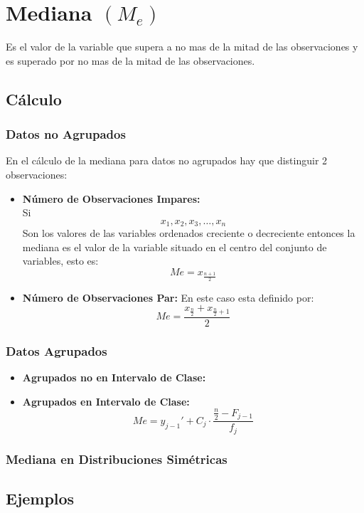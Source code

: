 \section{Mediana $(M_e)$}
Es el valor de la variable que supera a no mas de la mitad de las observaciones y es superado por no mas de la mitad de las observaciones.
\subsection{Cálculo}
\subsubsection{Datos no Agrupados}
En el cálculo de la mediana para datos no agrupados hay que distinguir 2 observaciones:
\begin{itemize}
\item \textbf{Número de Observaciones Impares:} \\${ }$\\ Si 
$$x_1,x_2,x_3,\ldots,x_n$$
Son los valores de las variables ordenados creciente o decreciente entonces la mediana es el valor de la variable situado en el centro del conjunto de variables, esto es:
$$Me=x_{\frac{n+1}{2}}$$
\item \textbf{Número de Observaciones Par:} En este caso esta definido por:
$$Me=\dfrac{x_{\frac{n}{2}}+x_{\frac{n}{2}+1}}{2}$$
\end{itemize}
\subsubsection{Datos Agrupados}
\begin{itemize}
\item \textbf{Agrupados no en Intervalo de Clase:}
\item \textbf{Agrupados en Intervalo de Clase:}
$$Me=y_{j-1}'+C_j\cdot \dfrac{\frac{n}{2}-F_{j-1}}{f_j}$$
\end{itemize}
\subsubsection{Mediana en Distribuciones Simétricas}
\subsection{Ejemplos}